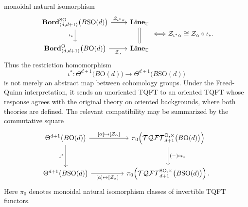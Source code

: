 \documentclass[aps,prx,reprint,superscriptaddress,twocolumn,amsmath,amssymb,amsfonts, nofootinbib]{revtex4-2}
\newcommand{\SO}{\text{SO}}
\newcommand{\bordd}{{\bf Bord}_{\langle d, d+1\rangle}}
\newcommand{\Line}{{\bf Line}_{\mathbb{C}}}
\newcommand{\tqftd}{\mathcal{TQFT}_{d+1}}
\theoremstyle{apsstyle}
\begin{document}
monoidal natural isomorphism
\begin{equation}
\begin{tikzcd}
\bordd^{\mathrm{SO}}\bigl(B\SO(d)\bigr)
\arrow[r,"\mathcal Z_{\iota^*\alpha}"]
\arrow[d,"\iota_*"']
&
\Line
\arrow[d,equal]
\\
\bordd^{\mathrm O}\bigl(B\mathrm O(d)\bigr)
\arrow[r,"\mathcal Z_\alpha"']
&
\Line
\end{tikzcd}
\Longleftrightarrow
\mathcal Z_{\iota^*\alpha}
\cong
\mathcal Z_\alpha\circ\iota_*.
\label{eq:FQ_SO_pullback}
\end{equation}
Thus the restriction homomorphism
\begin{equation*}
    \iota^*:
    \Theta^{d+1}\bigl(B\mathrm O(d)\bigr)
    \longrightarrow
    \Theta^{d+1}\bigl(B\SO(d)\bigr)
\end{equation*}
is not merely an abstract map between cohomology groups. Under the Freed-Quinn interpretation, it sends an unoriented TQFT to an oriented TQFT whose response agrees with the original theory on oriented backgrounds, where both theories are defined. The relevant compatibility may be summarized
by the commutative square
\begin{equation}
\begin{tikzcd}[column sep=huge,row sep=large]
\Theta^{d+1}\bigl(B\mathrm O(d)\bigr)
\arrow[r,"\text{[}\alpha\text{]}\mapsto\text{[}\mathcal Z_\alpha\text{]}"]
\arrow[d,"\iota^*"']
&
\pi_0\!\left(
\tqftd^{\mathrm O,\times}\bigl(B\mathrm O(d)\bigr)
\right)
\arrow[d,"(-)\circ\iota_*"]
\\
\Theta^{d+1}\bigl(B\SO(d)\bigr)
\arrow[r,"\text{[}\alpha\text{]}\mapsto\text{[}\mathcal Z_\alpha\text{]}"']
&
\pi_0\!\left(
\tqftd^{\mathrm{SO},\times}\bigl(B\SO(d)\bigr)
\right).
\end{tikzcd}
\label{eq:FQ_O_SO_classification_square}
\end{equation}
Here $\pi_0$ denotes monoidal natural isomorphism classes of invertible TQFT functors.

\bigskip 
\end{document}
